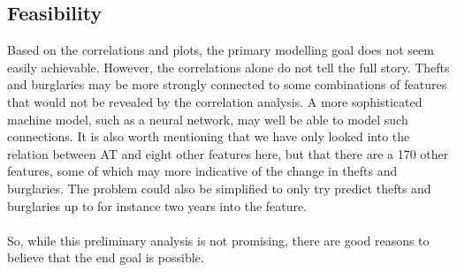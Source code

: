 \documentclass[11pt,fleqn]{article}
\numberwithin{footnote}{section}
\numberwithin{figure}{section}
\numberwithin{table}{section}
\begin{document}
\subsection{Feasibility}
Based on the correlations and plots, the primary modelling goal does not seem easily achievable.
However, the correlations alone do not tell the full story.
Thefts and burglaries may be more strongly connected to some combinations of features that would not be revealed by the correlation analysis. A more sophisticated machine model, such as a neural network, may well be able to model such connections.
It is also worth mentioning that we have only looked into the relation between AT and eight other features here, but that there are a 170 other features, some of which may more indicative of the change in thefts and burglaries.
The problem could also be simplified to only try predict thefts and burglaries up to for instance two years into the feature.\\
\\
So, while this preliminary analysis is not promising, there are good reasons to believe that the end goal is possible.
\pagebreak
\end{document}
